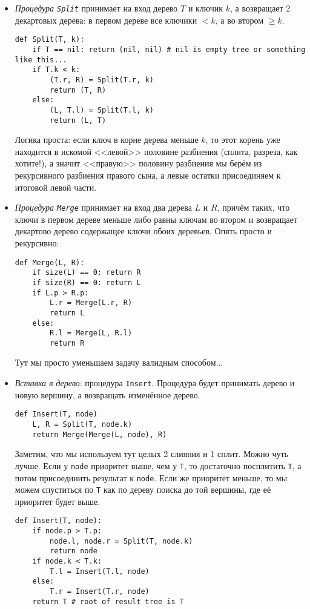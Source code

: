 \begin{itemize}
\item \emph{Процедура \texttt{Split}} принимает на вход дерево $T$ и ключик $k$, а возвращает 2 декартовых дерева: в первом дереве все ключики $< k$, а во втором $\geq k$.
\begin{verbatim}
def Split(T, k):
    if T == nil: return (nil, nil) # nil is empty tree or something like this...
    if T.k < k:
        (T.r, R) = Split(T.r, k)
        return (T, R)
    else:
        (L, T.l) = Split(T.l, k)
        return (L, T)
\end{verbatim}
Логика проста: если ключ в корне дерева меньше $k$, то этот корень уже находится в искомой <<левой>> половине разбиения (сплита, разреза, как хотите!), а значит <<правую>> половину разбиения мы берём из рекурсивного разбиения правого сына, а левые остатки присоединяем к итоговой левой части.

\item \emph{Процедура \texttt{Merge}} принимает на вход два дерева $L$ и $R$, причём таких, что ключи в первом дереве меньше либо равны ключам во втором и возвращает декартово дерево содержащее ключи обоих деревьев. Опять просто и рекурсивно:
\begin{verbatim}
def Merge(L, R):
	if size(L) == 0: return R
	if size(R) == 0: return L
	if L.p > R.p:
	    L.r = Merge(L.r, R)
	    return L
	else:
	    R.l = Merge(L, R.l)
	    return R
\end{verbatim}
Тут мы просто уменьшаем задачу валидным способом...

\item \emph{Вставка в дерево}: процедура \texttt{Insert}. Процедура будет принимать дерево и новую вершину, а возвращать изменённое дерево.
\begin{verbatim}
def Insert(T, node)
	L, R = Split(T, node.k)
	return Merge(Merge(L, node), R)
\end{verbatim}
Заметим, что мы используем тут целых 2 слияния и 1 сплит. Можно чуть лучше. Если у \texttt{node} приоритет выше, чем у \texttt{T}, то достаточно посплитить \texttt{T}, а потом присоединить результат к \texttt{node}. Если же приоритет меньше, то мы можем спуститься по \texttt{T} как по дереву поиска до той вершины, где её приоритет будет выше.
\begin{verbatim}
def Insert(T, node):
    if node.p > T.p:
        node.l, node.r = Split(T, node.k)
        return node
    if node.k < T.k:
        T.l = Insert(T.l, node) 
    else:
        T.r = Insert(T.r, node)
    return T # root of result tree is T
\end{verbatim}


\end{itemize}
